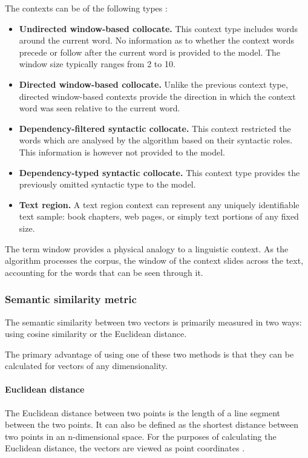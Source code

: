 \documentclass[14pt, a4paper]{extreport}
\begin{document}
The contexts can be of the following types \parencite{lenci}:

\begin{itemize}
  \item \textbf{Undirected window-based collocate.} This context type includes words around the current word. No information as to whether the context words precede or follow after the current word is provided to the model. The window size typically ranges from 2 to 10.
  \item \textbf{Directed window-based collocate.} Unlike the previous context type, directed window-based contexts provide the direction in which the context word was seen relative to the current word.
  \item \textbf{Dependency-filtered syntactic collocate.} This context restricted the words which are analysed by the algorithm based on their syntactic roles. This information is however not provided to the model.
  \item \textbf{Dependency-typed syntactic collocate.} This context type provides the previously omitted syntactic type to the model.
  \item \textbf{Text region.} A text region context can represent any uniquely identifiable text sample: book chapters, web pages, or simply text portions of any fixed size.
\end{itemize}

The term window provides a physical analogy to a linguistic context. As the algorithm processes the corpus, the window of the context slides across the text, accounting for the words that can be seen through it.
      \subsubsection{Semantic similarity metric}
The semantic similarity between two vectors is primarily measured in two ways: using cosine similarity or the Euclidean distance.

The primary advantage of using one of these two methods is that they can be calculated for vectors of any dimensionality.

\paragraph{Euclidean distance}

The Euclidean distance between two points is the length of a line segment between the two points. It can also be defined as the shortest distance between two points in an n-dimensional space. For the purposes of calculating the Euclidean distance, the vectors are viewed as point coordinates \parencite{oduntan}.
\end{document}
